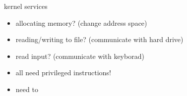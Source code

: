 \begin{frame}{kernel services}
\begin{itemize}
\item allocating memory? (change address space)
\item reading/writing to file? (communicate with hard drive)
\item read input? (communicate with keyborad)
\item all need privileged instructions!
\item need to 
\end{itemize}
\end{frame}

